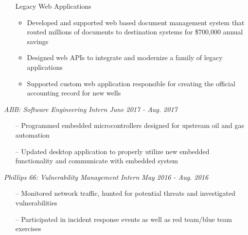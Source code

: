 \documentclass[line,overlapped,9pt]{res}
\begin{document}
\begin{resume}
\begin{itemize}[leftmargin=*]
                   \begin{itemize}
                  \setlength\itemsep{.1em}
                   \item Built the user interface for an API system which defined the single source of truth for well data within XTO (500,000 entity records from 11 source systems). 
                   \item Assisted data management team on API design to minimize long-term support for the application, which averaged 450 unique users each month    
                   \end{itemize}
                 \item[] Legacy Web Applications 
                   \begin{itemize}
                  \setlength\itemsep{.1em}
                   \item Developed and supported web based document management system that routed millions of documents to destination systems for \$700,000 annual savings 
                   \item Designed  web APIs to integrate and modernize a family of legacy applications 
                   \item Supported custom web application responsible for creating the official accounting record for new wells 
                   \end{itemize}
                 \end{itemize}
                 {\sl ABB: Software Engineering Intern  \hfill June 2017 - Aug. 2017 }
                 \begin{itemize}  %
                  \setlength\itemsep{.1em}
                 \item[--] Programmed embedded microcontrollers designed for upstream
                   oil and gas automation 
                 \item[--] Updated desktop application to properly utilize new embedded functionality and
                   communicate with embedded system
                 \end{itemize} 
                 {\sl Phillips 66: Vulnerability Management Intern
                   \hfill        May 2016 - Aug. 2016}
                  \begin{itemize} 
                  \setlength\itemsep{.1em}
                  \item[--] Monitored network traffic, hunted for potential threats and investigated vulnerabilities  
                  \item[--] Participated in incident response events as well as red team/blue team exercises 

\end{itemize}
\end{resume}
\end{document}
